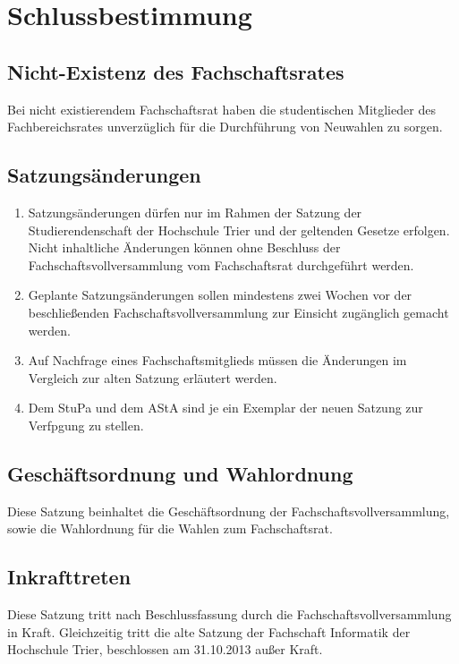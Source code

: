\section{Schlussbestimmung}
\subsection{Nicht-Existenz des Fachschaftsrates}
Bei nicht existierendem Fachschaftsrat haben die studentischen Mitglieder des Fachbereichsrates unverzüglich für die Durchführung von Neuwahlen zu sorgen.

\subsection{Satzungsänderungen}
\begin{enumerate}
\item Satzungsänderungen dürfen nur im Rahmen der Satzung der Studierendenschaft der Hochschule Trier und der geltenden Gesetze erfolgen. Nicht inhaltliche Änderungen können ohne Beschluss der Fachschaftsvollversammlung vom Fachschaftsrat durchgeführt werden.
\item Geplante Satzungsänderungen sollen mindestens zwei Wochen vor der beschließenden Fachschaftsvollversammlung zur Einsicht zugänglich gemacht werden.
\item Auf Nachfrage eines Fachschaftsmitglieds müssen die Änderungen im Vergleich zur alten Satzung erläutert werden.
\item Dem StuPa und dem AStA sind je ein Exemplar der neuen Satzung zur Verfpgung zu stellen.
\end{enumerate}

\subsection{Geschäftsordnung und Wahlordnung}
Diese Satzung beinhaltet die Geschäftsordnung der Fachschaftsvollversammlung, sowie die Wahlordnung für die Wahlen zum Fachschaftsrat.

\subsection{Inkrafttreten}
Diese Satzung tritt nach Beschlussfassung durch die Fachschaftsvollversammlung in Kraft. Gleichzeitig tritt die alte Satzung der Fachschaft Informatik der Hochschule Trier, beschlossen am 31.10.2013 außer Kraft.